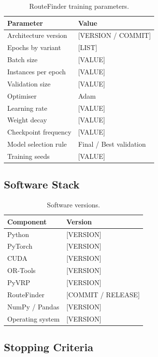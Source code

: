 \begin{table}[H]
\centering
\caption{RouteFinder training parameters.}
\label{tab:rftrain}
\begin{tabular}{ll}
\toprule
Parameter & Value \\
\midrule
Architecture version & [VERSION / COMMIT] \\
Epochs by variant & [LIST] \\
Batch size & [VALUE] \\
Instances per epoch & [VALUE] \\
Validation size & [VALUE] \\
Optimiser & Adam \\
Learning rate & [VALUE] \\
Weight decay & [VALUE] \\
Checkpoint frequency & [VALUE] \\
Model selection rule & Final / Best validation \\
Training seeds & [VALUE] \\
\bottomrule
\end{tabular}
\end{table}

\subsection{Software Stack}

\begin{table}[H]
\centering
\caption{Software versions.}
\label{tab:software}
\begin{tabular}{ll}
\toprule
Component & Version \\
\midrule
Python & [VERSION] \\
PyTorch & [VERSION] \\
CUDA & [VERSION] \\
OR-Tools & [VERSION] \\
PyVRP & [VERSION] \\
RouteFinder & [COMMIT / RELEASE] \\
NumPy / Pandas & [VERSION] \\
Operating system & [VERSION] \\
\bottomrule
\end{tabular}
\end{table}

\subsection{Stopping Criteria}

